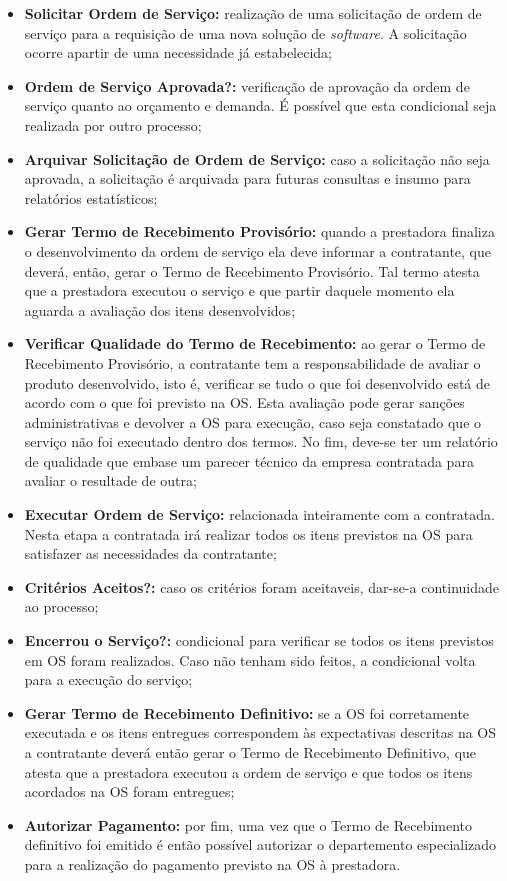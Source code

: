 \begin{itemize}
  \item \textbf{Solicitar Ordem de Serviço:} realização de uma solicitação de ordem
  de serviço para a requisição de uma nova solução de \textit{software}. A solicitação
  ocorre apartir de uma necessidade já estabelecida;
  \item \textbf{Ordem de Serviço Aprovada?:} verificação de aprovação da ordem de
  serviço quanto ao orçamento e demanda. É possível que esta condicional seja realizada
  por outro processo;
  \item \textbf{Arquivar Solicitação de Ordem de Serviço:} caso a solicitação não seja
  aprovada, a solicitação é arquivada para futuras consultas e insumo para relatórios
  estatísticos;
  \item \textbf{Gerar Termo de Recebimento Provisório:} quando a prestadora
  finaliza o desenvolvimento da ordem de serviço ela deve informar a contratante,
  que deverá, então, gerar o Termo de Recebimento Provisório. Tal termo atesta
  que a prestadora executou o serviço e que partir daquele momento ela aguarda
  a avaliação dos itens desenvolvidos;
  \item \textbf{Verificar Qualidade do Termo de Recebimento:} ao gerar o Termo de Recebimento Provisório,
  a contratante tem a responsabilidade de avaliar o produto desenvolvido, isto é,
  verificar se tudo o que foi desenvolvido está de acordo com o que foi previsto
  na OS. Esta avaliação pode gerar sanções administrativas e devolver a OS para
  execução, caso seja constatado que o serviço não foi executado dentro dos termos.
  No fim, deve-se ter um relatório de qualidade que embase um parecer técnico da
  empresa contratada para avaliar o resultade de outra;
  \item \textbf{Executar Ordem de Serviço:} relacionada inteiramente com a contratada.
  Nesta etapa a contratada irá realizar todos os itens previstos na OS para satisfazer
  as necessidades da contratante;
  \item \textbf{Critérios Aceitos?:} caso os critérios foram aceitaveis, dar-se-a
  continuidade ao processo;
  \item \textbf{Encerrou o Serviço?:} condicional para verificar se todos os itens
  previstos em OS foram realizados. Caso não tenham sido feitos, a condicional volta
  para a execução do serviço;
  \item \textbf{Gerar Termo de Recebimento Definitivo:} se a OS foi corretamente
  executada e os itens entregues correspondem às expectativas descritas na
  OS a contratante deverá então gerar o Termo de Recebimento Definitivo, que
  atesta que a prestadora executou a ordem de serviço e que todos os itens
  acordados na OS foram entregues;
  \item \textbf{Autorizar Pagamento:} por fim, uma vez que o Termo de Recebimento
  definitivo foi emitido é então possível autorizar o departemento especializado para
  a realização do pagamento previsto na OS à prestadora.
\end{itemize}

